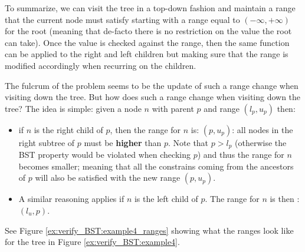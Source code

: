 To summarize, we can visit the tree in a top-down fashion and maintain a range that the current node must satisfy starting with a range equal to $(-\infty, +\infty)$ for the root (meaning that de-facto there is no restriction on the value the root can take). Once the value is checked against the range, then the same function can be applied to the right and left children but making sure that the range is modified accordingly when recurring on the children. 

The fulcrum of the problem seems to be the update of such a range change when visiting down the tree. But how does such a range change when visiting down the tree? The idea is simple: given a node $n$ with parent $p$ and range \( (l_p, u_p) \) then:
\begin{itemize}
	\item if $n$ is the right child of $p$, then the range for $n$ is: $(p, u_p)$: all nodes in the right subtree of $p$ must be \textbf{higher} than $p$. Note that $p > l_p$ (otherwise the BST property would be violated when checking $p$) and thus the range for $n$ becomes smaller; meaning that all the constrains coming from the ancestors of $p$ will also be satisfied with the new range $(p, u_p)$.
	\item A similar reasoning applies if $n$ is the left child of $p$. The range for $n$ is then : $(l_u,p)$.
\end{itemize}
See Figure \ref{ex:verify_BST:example4_ranges} showing what the ranges look like for the tree in Figure \ref{ex:verify_BST:example4}. 


